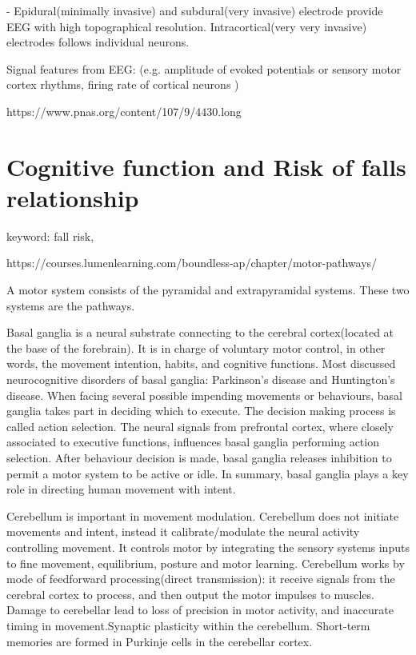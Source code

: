 \documentclass{article}
\begin{document}
- Epidural(minimally invasive) and subdural(very invasive) electrode provide EEG with high topographical resolution. Intracortical(very very invasive) electrodes follows individual neurons.

Signal features from EEG: (e.g. amplitude of evoked potentials or sensory motor cortex rhythms, firing rate of cortical neurons \cite{WOLPAW_2002})

https://www.pnas.org/content/107/9/4430.long



\section{Cognitive function and Risk of falls relationship}
keyword: fall risk,

https://courses.lumenlearning.com/boundless-ap/chapter/motor-pathways/

A motor system consists of the pyramidal and extrapyramidal systems. These two systems are the pathways.


Basal ganglia is a neural substrate connecting to the cerebral cortex(located at the base of the forebrain). It is in charge of voluntary motor control, in other words, the movement intention, habits, and cognitive functions. Most discussed neurocognitive disorders of basal ganglia: Parkinson's disease and Huntington's disease. When facing several possible impending movements or behaviours, basal ganglia takes part in deciding which to execute. The decision making process is called action selection. The neural signals from prefrontal cortex, where closely associated to executive functions, influences basal ganglia performing action selection. After behaviour decision is made, basal ganglia releases inhibition to permit a motor system to be active or idle. In summary, basal ganglia plays a key role in directing human movement with intent.

Cerebellum is important in movement modulation. Cerebellum does not initiate movements and intent, instead it calibrate/modulate the neural activity controlling movement. It controls motor by integrating the sensory systems inputs to fine movement, equilibrium, posture and motor learning. Cerebellum works by mode of feedforward processing(direct transmission): it receive signals from the cerebral cortex to process, and then output the motor impulses to muscles. Damage to cerebellar lead to loss of precision in motor activity, and inaccurate timing in movement.Synaptic plasticity within the cerebellum. Short-term memories are formed in Purkinje cells in the cerebellar cortex.
\end{document}
